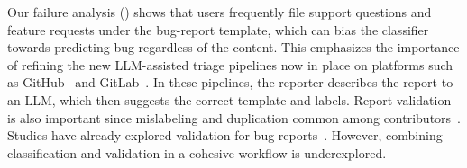 Our failure analysis () shows that users frequently file support questions and feature requests under the bug-report template, which can bias the classifier towards predicting bug regardless of the content. This emphasizes the importance of refining the new LLM-assisted triage pipelines now in place on platforms such as GitHub~\cite{githubcopilot} and GitLab~\cite{gitlabduo}. In these pipelines, the reporter describes the report to an LLM, which then suggests the correct template and labels. Report validation is also important since mislabeling and duplication  common  among contributors~\cite{antoniol2008bug, pandey2017automated}. Studies have already explored validation for bug reports~\cite{khatib2025assertflip, wang2024aegis, ahmed2025otter, dincc2025judge}. However, combining classification and validation in a cohesive workflow is underexplored.

